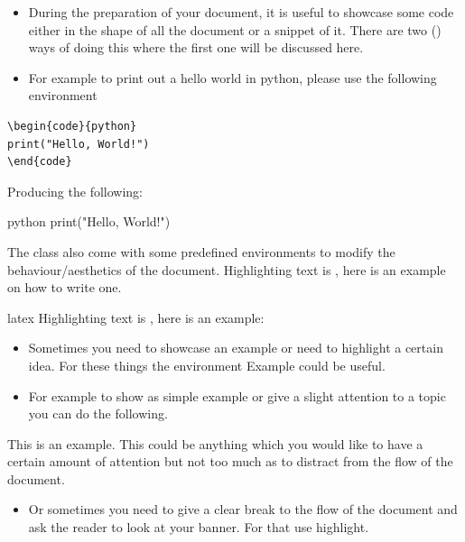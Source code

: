 \documentclass[minted, draw]{../tex/hebdomon}
\begin{document}
%
\begin{itemize}[leftmargin=!,labelindent=-29.2pt]
	\item[\pcode{code}] During the preparation of your document, it is useful to showcase
	      some code either in the shape of all the document or a snippet of it.
	      There are two () ways of doing this where the first one will be discussed here.
	\item[] For example to print out a hello world in python, please use the following environment
\end{itemize}
%
\begin{verbatim}
\begin{code}{python}
print("Hello, World!")
\end{code}
\end{verbatim}
%
Producing the following:
%
\begin{code}{python}
print("Hello, World!")
\end{code}
%
The class also come with some predefined environments to modify the behaviour/aesthetics of the document.
%
Highlighting text is , here is an example on how to write one.

\begin{code}{latex}
Highlighting text is , here is an example:
\end{code}

\begin{itemize}[leftmargin=!,labelindent=-29.2pt]
	\item[\pcode{example}] Sometimes you need to showcase an example or
	      need to highlight a certain idea.
	      For these things the environment Example could be useful.
	\item[] For example to show as simple example or give a slight attention to a topic you can do the following.
\end{itemize}

\begin{example}
	This is an example. This could be anything which you would like to have a certain amount of
	attention but not too much as to distract from the flow of the document.
\end{example}

\begin{itemize}[leftmargin=!,labelindent=-29.2pt]
	\item[\pcode{highlight}] Or sometimes you need to give a clear break to the flow of the
	      document and ask the reader to look at your banner. For that use highlight.
\end{itemize}
\end{document}
